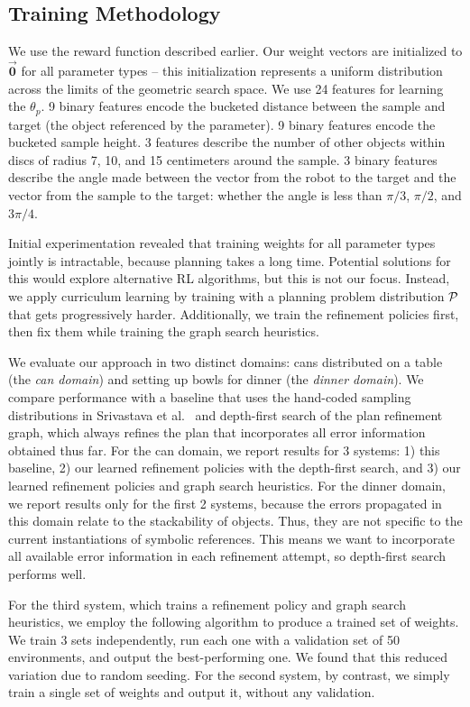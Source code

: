 \subsection{Training Methodology}
We use the reward function described earlier. Our weight
vectors are initialized to $\vec{\mathbf{0}}$ for all parameter types -- this
initialization represents a uniform distribution across the limits of the geometric search space.
We use 24 features for learning the $\theta_{p}$. 9 binary features encode the bucketed distance between the sample
and target (the object referenced by the parameter). 9 binary features encode the bucketed sample height. 3 features
describe the number of other objects within discs of radius 7, 10, and 15 centimeters around the
sample. 3 binary features describe the angle made between the vector from the
robot to the target and the vector from the sample to the target: whether the angle is less than
$\pi/3$, $\pi/2$, and $3\pi/4$.

Initial experimentation revealed that training weights for all parameter types jointly is intractable,
because planning takes a long time. Potential solutions for this would explore alternative RL algorithms,
but this is not our focus. Instead, we apply curriculum learning by training with a planning problem distribution
$\mathcal{P}$ that gets progressively harder. Additionally, we train the refinement policies first, then fix them while
training the graph search heuristics.

We evaluate our approach in two distinct domains: cans distributed on a table (the \emph{can domain})
and setting up bowls for dinner (the \emph{dinner domain}).
We compare performance with a baseline that uses the hand-coded sampling distributions
in Srivastava et al.~\cite{srivastava2014combined} and depth-first search of the
plan refinement graph, which always refines the plan that incorporates all error information obtained
thus far. For the can domain, we report results for 3 systems: 1) this baseline, 2) our learned refinement policies
with the depth-first search, and 3) our learned refinement policies and graph search heuristics.
For the dinner domain, we report results only for the first 2 systems, because the errors propagated in this
domain relate to the stackability of objects.
Thus, they are not specific to the current instantiations of symbolic references. This means we want to incorporate
all available error information in each refinement attempt, so depth-first search performs well.

For the third system, which trains a refinement policy and graph search heuristics, we employ the following
algorithm to produce a trained set of weights. We train 3 sets independently, run each
one with a validation set of 50 environments, and output the best-performing one. We found that this
reduced variation due to random seeding. For the second system, by contrast, we simply train a single
set of weights and output it, without any validation.

